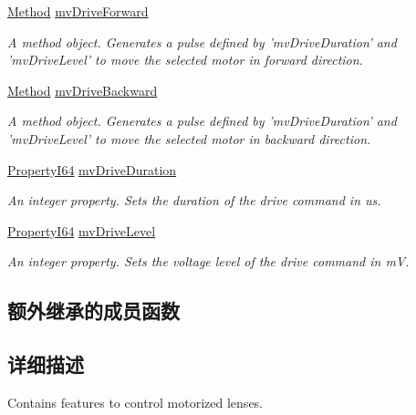 \begin{DoxyCompactItemize}
\hyperlink{classmv_i_m_p_a_c_t_1_1acquire_1_1_method}{Method} \hyperlink{classmv_i_m_p_a_c_t_1_1acquire_1_1_gen_i_cam_1_1mv_lens_control_a3aaebee0c8285e1be20c468a7f8e6342}{mv\+Drive\+Forward}
\begin{DoxyCompactList}\small\item\em A method object. Generates a pulse defined by 'mv\+Drive\+Duration' and 'mv\+Drive\+Level' to move the selected motor in forward direction. \end{DoxyCompactList}\item 
\hyperlink{classmv_i_m_p_a_c_t_1_1acquire_1_1_method}{Method} \hyperlink{classmv_i_m_p_a_c_t_1_1acquire_1_1_gen_i_cam_1_1mv_lens_control_a6299fe531c5cf9275c981adf5a5c8c69}{mv\+Drive\+Backward}
\begin{DoxyCompactList}\small\item\em A method object. Generates a pulse defined by 'mv\+Drive\+Duration' and 'mv\+Drive\+Level' to move the selected motor in backward direction. \end{DoxyCompactList}\item 
\hyperlink{group___common_interface_ga81749b2696755513663492664a18a893}{Property\+I64} \hyperlink{classmv_i_m_p_a_c_t_1_1acquire_1_1_gen_i_cam_1_1mv_lens_control_ab549cd58a4cc4f210c47c6868f5ec5d9}{mv\+Drive\+Duration}
\begin{DoxyCompactList}\small\item\em An integer property. Sets the duration of the drive command in us. \end{DoxyCompactList}\item 
\hyperlink{group___common_interface_ga81749b2696755513663492664a18a893}{Property\+I64} \hyperlink{classmv_i_m_p_a_c_t_1_1acquire_1_1_gen_i_cam_1_1mv_lens_control_a1575e6269e232773024c4e6896694175}{mv\+Drive\+Level}
\begin{DoxyCompactList}\small\item\em An integer property. Sets the voltage level of the drive command in m\+V. \end{DoxyCompactList}\end{DoxyCompactItemize}
\subsection*{额外继承的成员函数}


\subsection{详细描述}
Contains features to control motorized lenses. 

